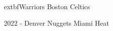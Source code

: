 \documentclass[
]{book}
\begin{document}
extbf{Warriors} \textbar{} Boston Celtics

2022 - Denver Nuggets \textbar{} Miami Heat

\end{document}
